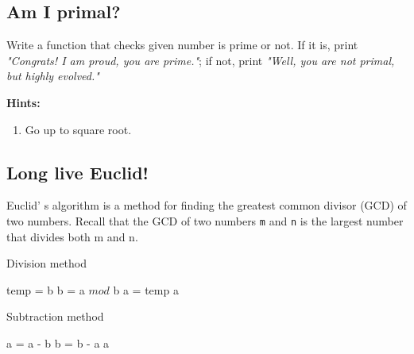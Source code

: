 \documentclass[a4paper]{article}
\begin{document}
\subsection{Am I primal?}

Write a function that checks given number is prime or not. If it is, print \textit{"Congrats! I am proud, you are prime."}; if not, print \textit{"Well, you are not primal, but highly evolved."}

\vspace{0.5cm}
\textbf{Hints:}
\begin{enumerate}
    \item Go up to square root.
\end{enumerate}

\newpage
\subsection{Long live Euclid!}
Euclid’ s algorithm is a method for finding the greatest common divisor (GCD) of two numbers. Recall that the GCD of two numbers \verb|m| and \verb|n| is the largest number that divides both m and n.

\begin{algorithm}
    \caption{Division method}
    \begin{algorithmic}[1]
                \State temp = b
                \State b = a $ mod $ b
                \State a = temp
            \EndWhile
            \State \Return a
        \EndFunction
    \end{algorithmic}
\end{algorithm}

\begin{algorithm}
    \caption{Subtraction method}
    \begin{algorithmic}[1]
                    \State a = a - b
                \Else
                    \State b = b - a
                \EndIf
            \EndWhile
            \State \Return a
        \EndFunction
    \end{algorithmic}
\end{algorithm}
\end{document}
